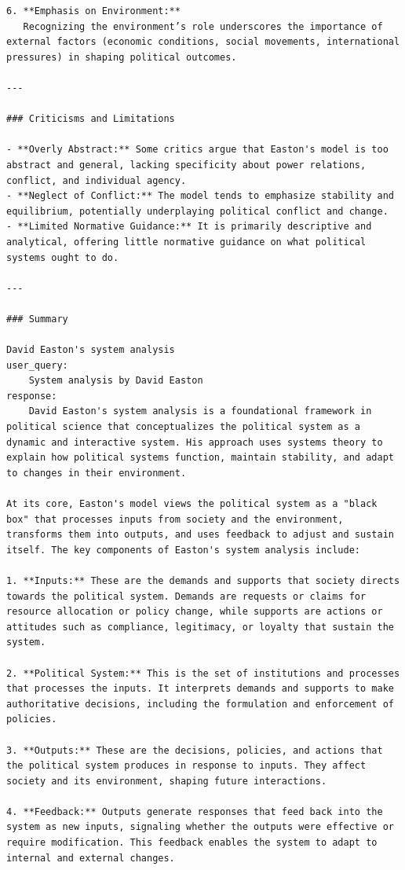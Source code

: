 \begin{instructbox}
\begin{lstlisting}[breakindent=0pt, breaklines=true, breakatwhitespace=true, frame=single, backgroundcolor=\color{green!10}]
6. **Emphasis on Environment:**
   Recognizing the environment’s role underscores the importance of external factors (economic conditions, social movements, international pressures) in shaping political outcomes.

---

### Criticisms and Limitations

- **Overly Abstract:** Some critics argue that Easton's model is too abstract and general, lacking specificity about power relations, conflict, and individual agency.
- **Neglect of Conflict:** The model tends to emphasize stability and equilibrium, potentially underplaying political conflict and change.
- **Limited Normative Guidance:** It is primarily descriptive and analytical, offering little normative guidance on what political systems ought to do.

---

### Summary

David Easton's system analysis
user_query:
    System analysis by David Easton
response:
    David Easton's system analysis is a foundational framework in political science that conceptualizes the political system as a dynamic and interactive system. His approach uses systems theory to explain how political systems function, maintain stability, and adapt to changes in their environment.

At its core, Easton's model views the political system as a "black box" that processes inputs from society and the environment, transforms them into outputs, and uses feedback to adjust and sustain itself. The key components of Easton's system analysis include:

1. **Inputs:** These are the demands and supports that society directs towards the political system. Demands are requests or claims for resource allocation or policy change, while supports are actions or attitudes such as compliance, legitimacy, or loyalty that sustain the system.

2. **Political System:** This is the set of institutions and processes that processes the inputs. It interprets demands and supports to make authoritative decisions, including the formulation and enforcement of policies.

3. **Outputs:** These are the decisions, policies, and actions that the political system produces in response to inputs. They affect society and its environment, shaping future interactions.

4. **Feedback:** Outputs generate responses that feed back into the system as new inputs, signaling whether the outputs were effective or require modification. This feedback enables the system to adapt to internal and external changes.


\end{lstlisting}
\end{instructbox}
